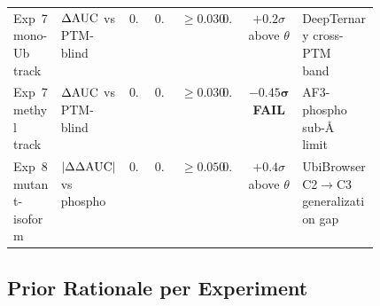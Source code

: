 \begin{table}[h]
\begin{tabular}{p{0.13\linewidth}p{0.14\linewidth}cccccp{0.21\linewidth}}
Exp~7 mono-Ub track & $\Delta\mathrm{AUC}$ vs PTM-blind & $0.040$ & $0.020$ & $\geq 0.030$ & $0.034$ & $+0.2\sigma$ above $\theta$ & DeepTernary cross-PTM band~\cite{deepternary-2025} \\
Exp~7 methyl track & $\Delta\mathrm{AUC}$ vs PTM-blind & $\mathbf{0.020}$ & $0.020$ & $\mathbf{\geq 0.030}$ & $\mathbf{0.021}$ & $\mathbf{-0.45\sigma}$ \textbf{FAIL} & AF3-phospho sub-\AA{} limit~\cite{bouvier-2025,af3-2024} \\
Exp~8 mutant-isoform & $|\Delta\Delta\mathrm{AUC}|$ vs phospho & $0.060$ & $0.020$ & $\geq 0.050$ & $0.058$ & $+0.4\sigma$ above $\theta$ & UbiBrowser C2$\to$C3 generalization gap~\cite{ubibrowser-2017} \\
\bottomrule
\end{tabular}
\end{table}

\subsection{Prior Rationale per Experiment}

